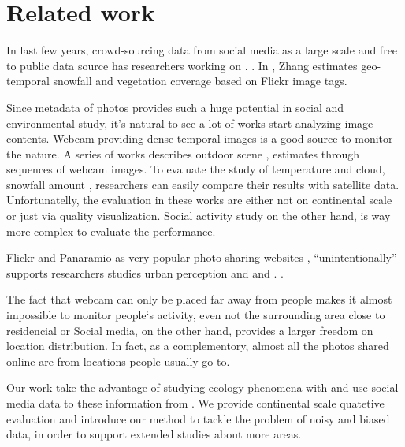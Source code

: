 \section{Related work}
In last few years, crowd-sourcing data from social media 
as a large scale and free to public data source
has  
researchers working on 
. .
In , Zhang \etal estimates geo-temporal snowfall and vegetation coverage 
based on Flickr image tags.

Since metadata of photos provides such a huge potential in social and environmental study, it's 
natural to see a lot of works start analyzing image contents. Webcam providing dense temporal images 
is a good source to monitor the nature. A series of works  
describes outdoor scene , estimates  through sequences 
of webcam images. 
To evaluate the study of temperature and cloud, snowfall amount ,
 researchers can easily compare their results with satellite data. Unfortunatelly, 
the evaluation in these works are either not on continental scale or just via quality visualization.
Social activity study on the other hand, is way more complex to evaluate the performance.

Flickr and Panaramio  as very popular photo-sharing websites , 
``unintentionally''  supports researchers studies urban perception and 
 and . .

The fact  that webcam can only be placed far away from people 
 makes it almost impossible to monitor people`s activity, even not the surrounding area close to
residencial or  Social media, on the other hand, provides a larger freedom on location distribution. 
In fact, as a complementory, almost all the photos shared online are from locations people usually go to. 

Our work take the advantage of studying ecology phenomena with  and use social media data to  these information from . We provide continental scale quatetive evaluation and introduce our
 method to tackle the problem of noisy and biased data, in order to support extended studies about 
more areas. 

